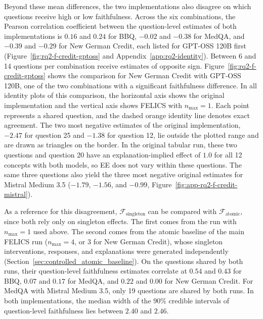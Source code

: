Beyond these mean differences, the two implementations also disagree on which questions receive high or low faithfulness. Across the six combinations, the Pearson correlation coefficient between the question-level estimates of both implementations is $0.16$ and $0.24$ for BBQ, $-0.02$ and $-0.38$ for MedQA, and $-0.39$ and $-0.29$ for New German Credit, each listed for GPT-OSS 120B first (Figure~\ref{fig:rq2-f-credit-gptoss} and Appendix~\ref{app:rq2-identity}). Between 6 and 14 questions per combination receive estimates of opposite sign. Figure~\ref{fig:rq2-f-credit-gptoss} shows the comparison for New German Credit with GPT-OSS 120B, one of the two combinations with a significant faithfulness difference. In all identity plots of this comparison, the horizontal axis shows the original implementation and the vertical axis shows FELICS with $n_{\max}=1$. Each point represents a shared question, and the dashed orange identity line denotes exact agreement. The two most negative estimates of the original implementation, $-2.47$ for question 25 and $-1.38$ for question 12, lie outside the plotted range and are drawn as triangles on the border. In the original tabular run, these two questions and question 20 have an explanation-implied effect of $1.0$ for all 12 concepts with both models, so EE does not vary within these questions. The same three questions also yield the three most negative original estimates for Mistral Medium 3.5 ($-1.79$, $-1.56$, and $-0.99$, Figure~\ref{fig:app-rq2-f-credit-mistral}).

As a reference for this disagreement, $\mathcal{F}_{\mathrm{singleton}}$ can be compared with $\mathcal{F}_{\mathrm{atomic}}$, since both rely only on singleton effects. The first comes from the run with $n_{\max}=1$ used above. The second comes from the atomic baseline of the main FELICS run ($n_{\max}=4$, or $3$ for New German Credit), whose singleton interventions, responses, and explanations were generated independently (Section~\ref{sec:controlled_atomic_baseline}). On the questions shared by both runs, their question-level faithfulness estimates correlate at $0.54$ and $0.43$ for BBQ, $0.07$ and $0.17$ for MedQA, and $0.22$ and $0.00$ for New German Credit. For MedQA with Mistral Medium 3.5, only 19 questions are shared by both runs. In both implementations, the median width of the 90\% credible intervals of question-level faithfulness lies between $2.40$ and $2.46$.

